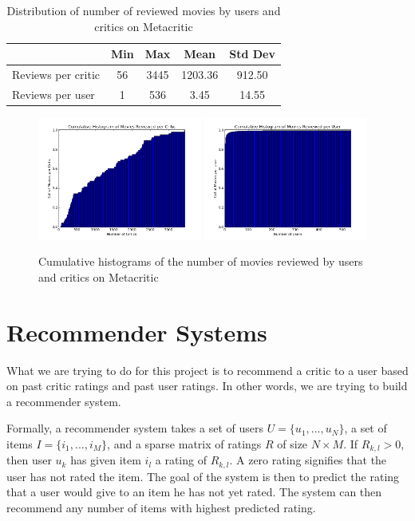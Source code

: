 \documentclass[12pt]{article}
\begin{document}
	\begin{table}[H]
	\centering
	 \caption{Distribution of number of reviewed movies by users and critics on Metacritic}

	 \begin{tabular}{ l | c | c | c | c }
	 \hline
	 &  Min & Max & Mean & Std Dev  \\
	 \hline
	 Reviews per critic & 56 & 3445 & 1203.36 & 912.50 \\
	 Reviews per user & 1 & 536 & 3.45 & 14.55 \\
	 \hline
	 \end{tabular}
	 \end{table}


	 \begin{figure}[H]
	    \centering
	    \includegraphics[width=0.48\textwidth]{plots/plot_m_crit_top.png}
	    \includegraphics[width=0.48\textwidth]{plots/plot_m_crit_usr.png}
	    \caption{Cumulative histograms of the number of movies reviewed by users and critics on Metacritic}
	    \label{fig:m_crit}
	\end{figure}

\section{Recommender Systems}

What we are trying to do for this project is to recommend a critic to a user based on past critic ratings and past user ratings. In other words, we are trying to build a recommender system.

Formally, a recommender system takes a set of users $U = \{u_1, ..., u_N\}$, a
set of items $I = \{i_1, ..., i_M\}$, and a sparse matrix of ratings
$R$ of size $N \times M$. If $R_{k,l} > 0$, then user $u_k$ has given item $i_l$ a rating of $R_{k,l}$. A zero rating signifies that the
user has not rated the item. The goal of the system is then to predict the rating that a user would give to an item he has not yet rated. The system can
then recommend any number of items with highest predicted rating.
\end{document}
